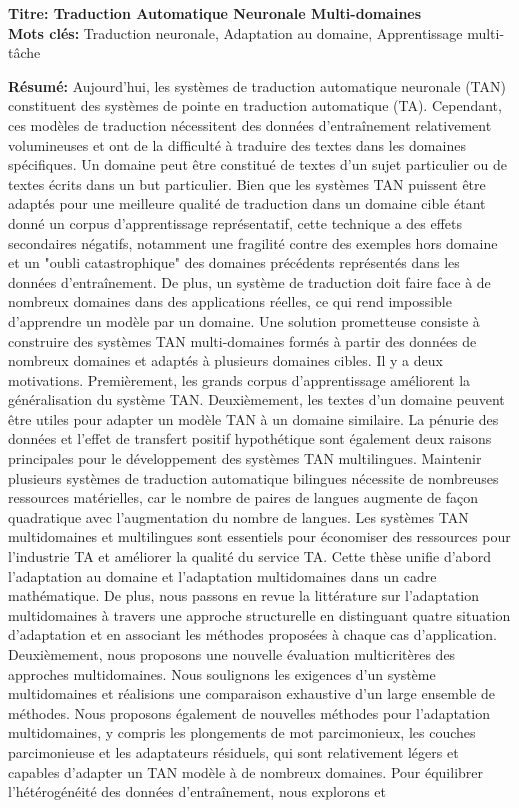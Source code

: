 \begin{mdframed}[linecolor=Prune,linewidth=1,nobreak=false]
\footnotesize	
\onehalfspacing
\textbf{Titre: Traduction Automatique Neuronale Multi-domaines} \\
\noindent \textbf{Mots clés:} Traduction neuronale, Adaptation au domaine, Apprentissage multi-tâche
\vspace{-.1cm}
\begin{multicols}{2}
\noindent \textbf{Résumé:} Aujourd'hui, les systèmes de traduction automatique neuronale (TAN) constituent des systèmes de pointe en traduction automatique (TA). Cependant, ces modèles de traduction nécessitent des données d'entraînement relativement volumineuses et ont de la difficulté à traduire des textes dans les domaines spécifiques. Un domaine peut être constitué de textes d'un sujet particulier ou de textes écrits dans un but particulier. Bien que les systèmes TAN puissent être adaptés pour une meilleure qualité de traduction dans un domaine cible étant donné un corpus d'apprentissage représentatif, cette technique a des effets secondaires négatifs, notamment une fragilité contre des exemples hors domaine et un "oubli catastrophique" des domaines précédents représentés dans les données d'entraînement. De plus, un système de traduction doit faire face à de nombreux domaines dans des applications réelles, ce qui rend impossible d'apprendre un modèle par un domaine. Une solution prometteuse consiste à construire des systèmes TAN multi-domaines formés à partir des données de nombreux domaines et adaptés à plusieurs domaines cibles. Il y a deux motivations. Premièrement, les grands corpus d'apprentissage améliorent la généralisation du système TAN. Deuxièmement, les textes d'un domaine peuvent être utiles pour adapter un modèle TAN à un domaine similaire. La pénurie des données et l'effet de transfert positif hypothétique sont également deux raisons principales pour le développement des systèmes TAN multilingues. Maintenir plusieurs systèmes de traduction automatique bilingues nécessite de nombreuses ressources matérielles, car le nombre de paires de langues augmente de façon quadratique avec l'augmentation du nombre de langues. Les systèmes TAN multidomaines et multilingues sont essentiels pour économiser des ressources pour l'industrie TA et améliorer la qualité du service TA. Cette thèse unifie d'abord l'adaptation au domaine et l'adaptation multidomaines dans un cadre mathématique. De plus, nous passons en revue la littérature sur l'adaptation multidomaines à travers une approche structurelle en distinguant quatre situation d'adaptation et en associant les méthodes proposées à chaque cas d'application. Deuxièmement, nous proposons une nouvelle évaluation multicritères des approches multidomaines. Nous soulignons les exigences d'un système multidomaines et réalisions une comparaison exhaustive d'un large ensemble de méthodes. Nous proposons également de nouvelles méthodes pour l'adaptation multidomaines, y compris les plongements de mot parcimonieux, les couches parcimonieuse et les adaptateurs résiduels, qui sont relativement légers et capables d'adapter un TAN modèle à de nombreux domaines. Pour équilibrer l'hétérogénéité des données d'entraînement, nous explorons et 
\end{multicols}
\end{mdframed}
